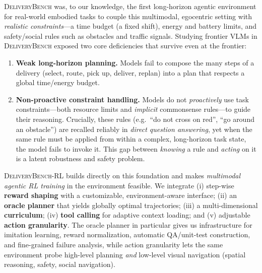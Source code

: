 \documentclass[11pt]{article}
\newcommand{\ours}{\textsc{DeliveryBench-RL}\xspace}
\newcommand{\dbone}{\textsc{DeliveryBench}\xspace}
\begin{document}
\dbone was, to our knowledge, the first long-horizon agentic environment for
real-world embodied tasks to couple this multimodal, egocentric setting with
\emph{realistic constraints}---a time budget (a fixed shift), energy and
battery limits, and safety/social rules such as obstacles and traffic signals.
Studying frontier VLMs in \dbone exposed two core deficiencies that survive
even at the frontier:
\begin{enumerate}[leftmargin=1.4em,itemsep=2pt,topsep=2pt]
  \item \textbf{Weak long-horizon planning.} Models fail to compose the many
        steps of a delivery (select, route, pick up, deliver, replan) into a
        plan that respects a global time/energy budget.
  \item \textbf{Non-proactive constraint handling.} Models do not
        \emph{proactively} use task constraints---both resource limits and
        \emph{implicit} commonsense rules---to guide their reasoning. Crucially,
        these rules (e.g.\ ``do not cross on red'', ``go around an obstacle'')
        are recalled reliably in \emph{direct question answering}, yet when the
        same rule must be applied from within a complex, long-horizon task
        state, the model fails to invoke it. This gap between
        \emph{knowing} a rule and \emph{acting} on it is a latent robustness and
        safety problem.
\end{enumerate}

\ours builds directly on this foundation and makes \emph{multimodal agentic RL
training} in the environment feasible. We integrate (i) step-wise
\textbf{reward shaping} with a customizable, environment-aware interface;
(ii) an \textbf{oracle planner} that yields globally optimal trajectories;
(iii) a multi-dimensional \textbf{curriculum}; (iv) \textbf{tool calling} for
adaptive context loading; and (v) adjustable \textbf{action granularity}.
The oracle planner in particular gives us infrastructure for imitation
learning, reward normalization, automatic QA/unit-test construction, and
fine-grained failure analysis, while action granularity lets the same
environment probe high-level planning \emph{and} low-level visual navigation
(spatial reasoning, safety, social navigation).
\end{document}
